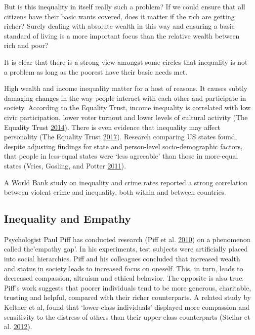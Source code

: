 \documentclass[]{tufte-handout}
\begin{document}
But is this inequality in itself really such a problem? If we could
ensure that all citizens have their basic wants covered, does it matter
if the rich are getting richer? Surely dealing with absolute wealth in
this way and ensuring a basic standard of living is a more important
focus than the relative wealth between rich and poor?

It is clear that there is a strong view amongst some circles that
inequality is not a problem as long as the poorest have their basic
needs met.

High wealth and income inequality matter for a host of reasons. It
causes subtly damaging changes in the way people interact with each
other and participate in society. According to the Equality Trust,
income inequality is correlated with low civic participation, lower
voter turnout and lower levels of cultural activity (The Equality Trust
\protect\hyperlink{ref-EqualityTrust2014}{2014}). There is even evidence
that inequality may affect personality (The Equality Trust
\protect\hyperlink{ref-EqualityTrust2017}{2017}). Research comparing US
states found, despite adjusting findings for state and person-level
socio-demographic factors, that people in less-equal states were `less
agreeable' than those in more-equal states (Vries, Gosling, and Potter
\protect\hyperlink{ref-DeVries2011}{2011}).

A World Bank study on inequality and crime rates reported a strong
correlation between violent crime and inequality, both within and
between countries.

\hypertarget{inequality-and-empathy}{%
\subsection{Inequality and Empathy}\label{inequality-and-empathy}}

Psychologist Paul Piff has conducted research (Piff et al.
\protect\hyperlink{ref-Piff2010}{2010}) on a phenomenon called
the'empathy gap'. In his experiments, test subjects were artificially
placed into social hierarchies. Piff and his colleagues concluded that
increased wealth and status in society leads to increased focus on
oneself. This, in turn, leads to decreased compassion, altruism and
ethical behavior. The opposite is also true. Piff's work suggests that
poorer individuals tend to be more generous, charitable, trusting and
helpful, compared with their richer counterparts. A related study by
Keltner et al, found that `lower-class individuals' displayed more
compassion and sensitivity to the distress of others than their
upper-class counterparts (Stellar et al.
\protect\hyperlink{ref-Stellar2012}{2012}).
\end{document}
